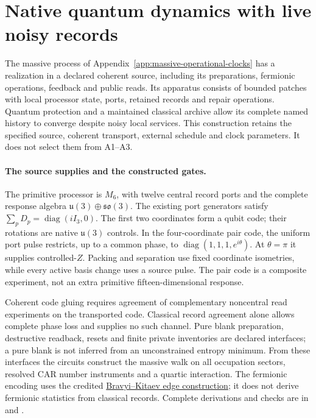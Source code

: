 \section{Native quantum dynamics with live noisy records}
\label{sec:noisy-native-source-refinement}

The massive process of Appendix~\ref{app:massive-operational-clocks} has
a realization in a declared coherent source, including its preparations,
fermionic operations, feedback and public reads. Its apparatus consists of
bounded patches with local processor state, ports, retained records and
repair operations. Quantum protection and a maintained classical archive
allow its complete named history to converge despite noisy local services.
This construction retains the specified source, coherent transport,
external schedule and clock parameters. It does not select them from
A1--A3.

\paragraph{The source supplies and the constructed gates.}
The primitive processor is $M_6$, with twelve central record ports and
the complete response algebra $\mathfrak u(3)\oplus\mathfrak{so}(3)$.
The existing port generators satisfy
$\sum_p D_p=\operatorname{diag}(iI_3,0)$.
The first two coordinates form a qubit code; their rotations are native
$\mathfrak u(3)$ controls. In the four-coordinate pair code, the uniform
port pulse restricts, up to a common phase, to
$\operatorname{diag}(1,1,1,e^{i\theta})$.
At $\theta=\pi$ it supplies controlled-$Z$. Packing and separation use
fixed coordinate isometries, while every active basis change uses a source
pulse. The pair code is a composite experiment, not an extra primitive
fifteen-dimensional response.

Coherent code gluing requires agreement of complementary noncentral read
experiments on the transported code. Classical record agreement alone
allows complete phase loss and supplies no such channel. Pure blank
preparation, destructive readback, resets and finite private inventories
are declared interfaces; a pure blank is not inferred from an unconstrained
entropy minimum. From these interfaces the circuits construct the massive
walk on all occupation sectors, resolved CAR number instruments and a
quartic interaction. The fermionic encoding uses the credited
\href{https://arxiv.org/abs/quant-ph/0003137}{Bravyi--Kitaev edge construction};
it does not derive fermionic statistics from classical records. Complete
derivations and checks are in  and
.


